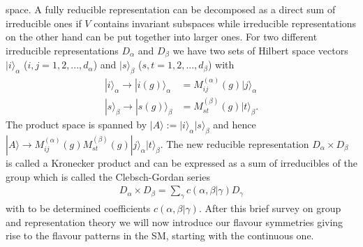 space. A fully reducible representation can be decomposed as a direct sum of irreducible ones if $V$ contains invariant subspaces while irreducible
representations on the other hand can be put together into larger ones. For two different irreducible representations $D_\alpha$ and $D_\beta$ 
we have two sets of Hilbert space vectors $|i\rangle_\alpha$ ($i,j=1,2,...,d_\alpha$) and $|s\rangle_\beta$ ($s,t=1,2,...,d_\beta$) with
\begin{align}
 |i\rangle_\alpha \rightarrow |i(g)\rangle_\alpha &= M^{(\alpha)}_{ij}(g)|j\rangle_\alpha\\
 |s\rangle_\beta \rightarrow |s(g)\rangle_\beta &= M^{(\beta)}_{st}(g)|t\rangle_\beta.
\end{align}
The product space is spanned by $|A\rangle := |i\rangle_\alpha |s\rangle_\beta$ and hence 
$|A\rangle \rightarrow M^{(\alpha)}_{ij}(g)M^{(\beta)}_{st}(g)|j\rangle_\alpha|t\rangle_\beta$. The new reducible representation $D_\alpha\times D_\beta$
is called a Kronecker product and can be expressed as a sum of irreducibles of the group which is called the Clebsch-Gordan series
\begin{align}
 D_\alpha \times D_\beta = \sum\limits_\gamma c(\alpha,\beta|\gamma) D_\gamma
 \label{eq_clebschseries}
\end{align}
with to be determined coefficients $c(\alpha,\beta|\gamma)$. After this brief survey on group and representation theory we will now introduce
our flavour symmetries giving rise to the flavour patterns in the SM, starting with the continuous one.



% 
% 
% 
% 
% 
% 
% 
% 
% 
